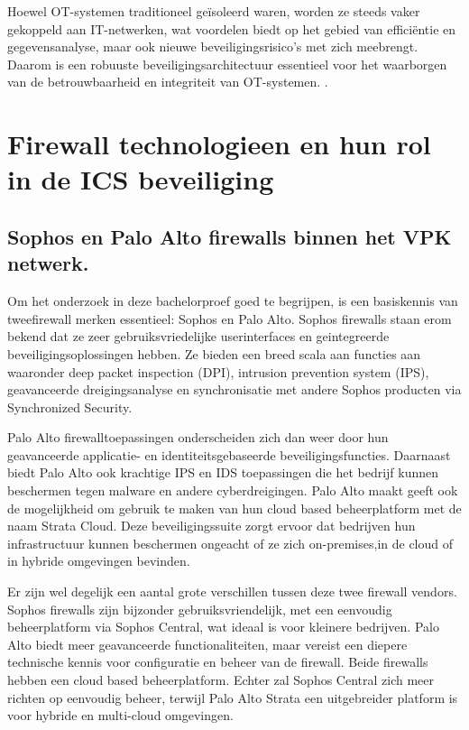 Hoewel OT-systemen traditioneel geïsoleerd waren, worden ze steeds vaker gekoppeld aan IT-netwerken, wat voordelen biedt op het gebied van efficiëntie en gegevensanalyse, maar ook nieuwe beveiligingsrisico’s met zich meebrengt. Daarom is een robuuste beveiligingsarchitectuur essentieel voor het waarborgen van de betrouwbaarheid en integriteit van OT-systemen. \autocite{Stouffer2023}.

\section{Firewall technologieen en hun rol in de ICS beveiliging}

\subsection{Sophos en Palo Alto firewalls binnen het VPK netwerk.}
Om het onderzoek in deze bachelorproef goed te begrijpen, is een basiskennis van tweefirewall merken essentieel: Sophos en Palo Alto. Sophos firewalls staan erom bekend dat ze zeer gebruiksvriedelijke userinterfaces en geintegreerde beveiligingsoplossingen hebben. Ze bieden een breed scala aan functies aan waaronder deep packet inspection (DPI), intrusion prevention system (IPS), geavanceerde dreigingsanalyse en synchronisatie met andere Sophos producten via Synchronized Security. \autocite{Phipps2024}

Palo Alto firewalltoepassingen onderscheiden zich dan weer door hun geavanceerde applicatie- en identiteitsgebaseerde beveiligingsfuncties. Daarnaast biedt Palo Alto ook krachtige IPS en IDS toepassingen die het bedrijf kunnen beschermen tegen malware en andere cyberdreigingen. Palo Alto maakt geeft ook de mogelijkheid om gebruik te maken van hun cloud based beheerplatform met de naam Strata Cloud. Deze beveiligingssuite zorgt ervoor dat bedrijven hun infrastructuur kunnen beschermen ongeacht of ze zich on-premises,in de cloud of in hybride omgevingen bevinden. \autocite{shread2023}

Er zijn wel degelijk een aantal grote verschillen tussen deze twee firewall vendors. Sophos firewalls zijn bijzonder gebruiksvriendelijk, met een eenvoudig beheerplatform via Sophos Central, wat ideaal is voor kleinere bedrijven. Palo Alto biedt meer geavanceerde functionaliteiten, maar vereist een diepere technische kennis voor configuratie en beheer van de firewall. Beide firewalls hebben een cloud based beheerplatform. Echter zal Sophos Central zich meer richten op eenvoudig beheer, terwijl Palo Alto Strata een uitgebreider platform is voor hybride en multi-cloud omgevingen. \autocite{paloGuard2025} 


